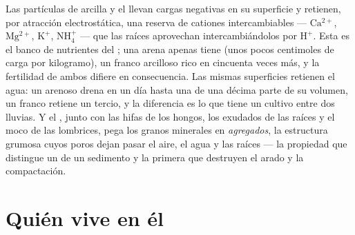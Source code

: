 \begin{proposition}\label{prop:b2:living-soil:cec}
Las partículas de arcilla y el  llevan cargas negativas en su
superficie y retienen, por atracción electrostática, una reserva de
cationes intercambiables ---
$\mathrm{Ca^{2+}}$, $\mathrm{Mg^{2+}}$, $\mathrm{K^{+}}$, $\mathrm{NH_4^{+}}$ --- que
las raíces aprovechan intercambiándolos por $\mathrm{H^{+}}$. Esta
\emph{} es el banco de nutrientes del
; una arena apenas tiene (unos pocos centimoles de carga por
kilogramo), un franco arcilloso rico en  cincuenta veces más, y la
fertilidad de ambos difiere en consecuencia. Las mismas superficies
retienen el agua: un  arenoso drena en un día hasta una
\emph{} de una décima parte de su volumen, un franco
retiene un tercio, y la diferencia es lo que tiene un cultivo entre dos
lluvias. Y el , junto con las hifas de los hongos, los exudados de
las raíces y el moco de las lombrices, pega los granos minerales en
\emph{agregados}, la estructura grumosa cuyos poros dejan pasar el aire,
el agua y las raíces --- la propiedad que distingue un  de un
sedimento y la primera que destruyen el arado y la compactación.
\end{proposition}

\section{Quién vive en él}


